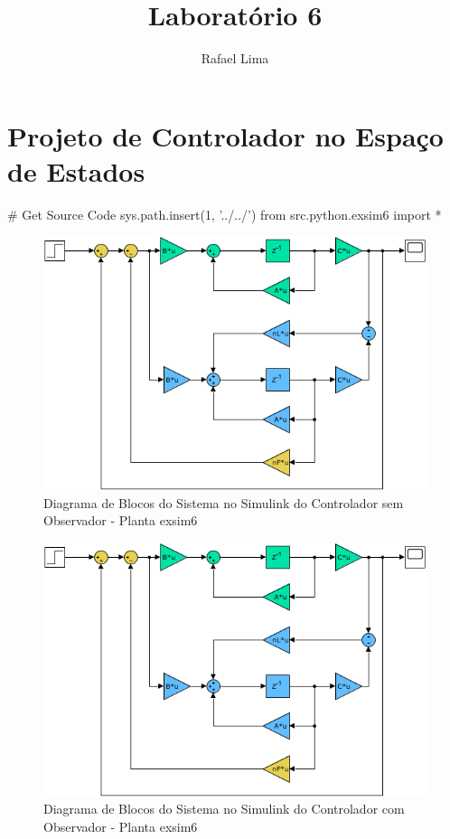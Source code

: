 \documentclass[a4paper,11pt]{article}
\title{Laboratório 6} %
\author{Rafael Lima}
\begin{document}

\section{Projeto de Controlador no Espaço de Estados}

\begin{sympycode}
# Get Source Code
sys.path.insert(1, '../../')
from src.python.exsim6 import *
\end{sympycode}


\begin{figure}[H]
    \centering
    \includegraphics[width=0.9\linewidth]{img/exsim6_ss_model.png}
    \caption{Diagrama de Blocos do Sistema no Simulink do Controlador sem Observador - Planta exsim6}
\end{figure}

\begin{figure}[H]
    \centering
    \includegraphics[width=0.9\linewidth]{img/exsim6_ss_observer_model.png}
    \caption{Diagrama de Blocos do Sistema no Simulink do Controlador com Observador - Planta exsim6}
\end{figure}
\end{document}
